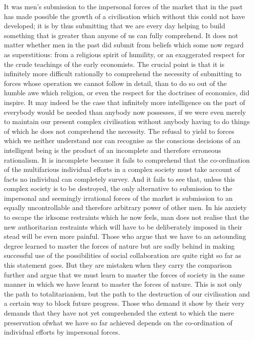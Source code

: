 \documentclass[11pt,openany]{book}
\begin{document}
It was men's submission to the impersonal forces of the market that in the past has made possible the growth of a civilisation which without this could not have developed; it is by thus submitting that we are every day helping to build something that is greater than anyone of us can fully comprehend. It does not matter whether men in the past did submit from beliefs which some now regard as superstitious: from a religious spirit of humility, or an exaggerated respect for the crude teachings of the early economists. The crucial point is that it is infinitely more difficult rationally to comprehend the necessity of submitting to forces whose operation we cannot follow in detail, than to do so out of the humble awe which religion, or even the respect for the doctrines of economics, did inspire. It may indeed be the case that infinitely more intelligence on the part of everybody would be needed than anybody now possesses, if we were even merely to maintain our present complex civilisation without anybody having to do things of which he does not comprehend the necessity. The refusal to yield to forces which we neither understand nor can recognise as the conscious decisions of an intelligent being is the product of an incomplete and therefore erroneous rationalism. It is incomplete because it fails to comprehend that the co-ordination of the multifarious individual efforts in a complex society must take account of facts no individual can completely survey. And it fails to see that, unless this complex society is to be destroyed, the only alternative to submission to the impersonal and seemingly irrational forces of the market is submission to an equally uncontrollable and therefore arbitrary power of other men. In his anxiety to escape the irksome restraints which he now feels, man does not realise that the new authoritarian restraints which will have to be deliberately imposed in their stead will be even more painful. Those who argue that we have to an astounding degree learned to master the forces of nature but are sadly behind in making successful use of the possibilities of social collaboration are quite right so far as this statement goes. But they are mistaken when they carry the comparison further and argue that we must learn to master the forces of society in the same manner in which we have learnt to master the forces of nature. This is not only the path to totalitarianism, but the path to the destruction of our civilisation and a certain way to block future progress. Those who demand it show by their very demands that they have not yet comprehended the extent to which the mere preservation ofwhat we have so far achieved depends on the co-ordination of individual efforts by impersonal forces.
\end{document}
